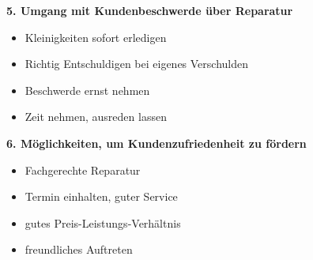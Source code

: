 \textbf{5. Umgang mit Kundenbeschwerde über Reparatur}

\begin{itemize}
\item
  Kleinigkeiten sofort erledigen
\item
  Richtig Entschuldigen bei eigenes Verschulden
\item
  Beschwerde ernst nehmen
\item
  Zeit nehmen, ausreden lassen
\end{itemize}

\textbf{6. Möglichkeiten, um Kundenzufriedenheit zu fördern}

\begin{itemize}
\item
  Fachgerechte Reparatur
\item
  Termin einhalten, guter Service
\item
  gutes Preis-Leistungs-Verhältnis
\item
  freundliches Auftreten
\end{itemize}
